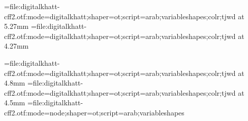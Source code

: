 \edef\pdfcompresslevel{\pdfvariable compresslevel}
\edef\pdfobjcompresslevel{\pdfvariable objcompresslevel}
\edef\pdfgentounicode{\pdfvariable gentounicode}
\newattribute{\tajweedatt}
\newattribute{\sajdaatt}



\newbox\ayaframe
\newcount\suranum


\def\suraline#1{%
\global\advance\suranum by1%
\leavevmode\raise1.2em\hbox to 0pt{\pdfbookmark{\the\suranum. #1}{sura\the\suranum}}%
\hbox to 0pt{\copy\ayaframe\hss}\centerline{\medinasura\textdir TRT#1}%
}%
\def\bismline#1{\centerline{\medinasura\textdir TRT#1}}



\def\sajdabar#1{\setattribute{\sajdaatt}{1}#1\unsetattribute{\sajdaatt}\directlua{addsajdacallback()}%
}

\font\medinafontvar={file:digitalkhatt-cff2.otf:mode=digitalkhatt;shaper=ot;script=arab;variableshapes;colr;tjwd} at 5.27mm
\font\medinafontvarmadina={file:digitalkhatt-cff2.otf:mode=digitalkhatt;shaper=ot;script=arab;variableshapes;colr;tjwd} at 4.27mm


\font\medinasura={file:digitalkhatt-cff2.otf:mode=digitalkhatt;shaper=ot;script=arab;variableshapes;colr;tjwd} at 4.8mm
\font\fatiha={file:digitalkhatt-cff2.otf:mode=digitalkhatt;shaper=ot;script=arab;variableshapes;colr;tjwd} at 4.5mm
\font\medinafontvarnode={file:digitalkhatt-cff2.otf:mode=node;shaper=ot;script=arab;variableshapes}

\renewcommand{\baselinestretch}{2.25}
\lineskiplimit=-100pt

\parindent=0pt
\parfillskip=0pt

\def\topglue{\nointerlineskip \vglue-\topskip \vglue}

\def\ayagraphic{\centerline{\lower1em\hbox{\texttt{[image: ayaframe.pdf]}}}}

